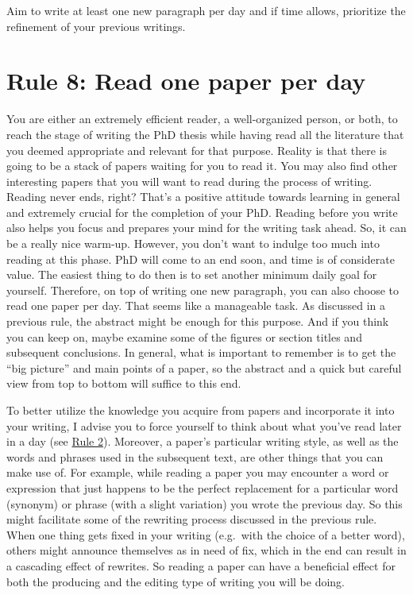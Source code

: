 \documentclass[
  12pt,
]{book}
\begin{document}
Aim to write at least one new paragraph per day and if time allows, prioritize the refinement of your previous writings.

\hypertarget{rule8}{%
\section*{\texorpdfstring{\textbf{Rule 8:} Read one paper per day}{Rule 8: Read one paper per day}}\label{rule8}}

\indent

You are either an extremely efficient reader, a well-organized person, or both, to reach the stage of writing the PhD thesis while having read all the literature that you deemed appropriate and relevant for that purpose.
Reality is that there is going to be a stack of papers waiting for you to read it.
You may also find other interesting papers that you will want to read during the process of writing.
Reading never ends, right?
That's a positive attitude towards learning in general and extremely crucial for the completion of your PhD.
Reading before you write also helps you focus and prepares your mind for the writing task ahead.
So, it can be a really nice warm-up.
However, you don't want to indulge too much into reading at this phase.
PhD will come to an end soon, and time is of considerate value.
The easiest thing to do then is to set another minimum daily goal for yourself.
Therefore, on top of writing one new paragraph, you can also choose to read one paper per day.
That seems like a manageable task.
As discussed in a previous rule, the abstract might be enough for this purpose.
And if you think you can keep on, maybe examine some of the figures or section titles and subsequent conclusions.
In general, what is important to remember is to get the ``big picture'' and main points of a paper, so the abstract and a quick but careful view from top to bottom will suffice to this end.

To better utilize the knowledge you acquire from papers and incorporate it into your writing, I advise you to force yourself to think about what you've read later in a day (see \protect\hyperlink{rule2}{Rule 2}).
Moreover, a paper's particular writing style, as well as the words and phrases used in the subsequent text, are other things that you can make use of.
For example, while reading a paper you may encounter a word or expression that just happens to be the perfect replacement for a particular word (synonym) or phrase (with a slight variation) you wrote the previous day.
So this might facilitate some of the rewriting process discussed in the previous rule.
When one thing gets fixed in your writing (e.g.~with the choice of a better word), others might announce themselves as in need of fix, which in the end can result in a cascading effect of rewrites.
So reading a paper can have a beneficial effect for both the producing and the editing type of writing you will be doing.
\end{document}
